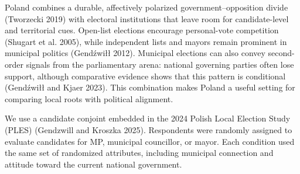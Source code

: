 \documentclass[
  letterpaper,
  DIV=11,
  numbers=noendperiod]{scrartcl}
\newcommand{\criticmarkupadd}[1]{#1}
\newcommand{\criticmarkuprm}[1]{}
\begin{document}
\criticmarkuprm{Candidate conjoint experiments}\criticmarkupadd{Poland
combines a durable, affectively polarized government--opposition divide
(Tworzecki 2019) with electoral institutions that leave room for
candidate-level and territorial cues. Open-list elections encourage
personal-vote competition (Shugart et al. 2005), while independent lists
and mayors remain prominent in municipal politics (Gendźwiłł 2012).
Municipal elections} can \criticmarkuprm{compare several
candidate}\criticmarkupadd{also convey second-order} signals
\criticmarkuprm{within}\criticmarkupadd{from the parliamentary arena:
national governing parties often lose support, although comparative
evidence shows that this pattern is conditional (Gendźwiłł and Kjaer
2023). This combination makes Poland} a \criticmarkuprm{common choice
environment (Hainmueller et al. 2014; Schwarz and Coppock 2022).
Existing applications show that}\criticmarkupadd{useful setting for
comparing} local \criticmarkuprm{ties matter in candidate selection
among party elites (Berz and Jankowski 2022) and alongside party labels
among voters in a polarized US setting (Munis 2021). Our design connects
three comparisons in one argument. The graded treatment establishes
whether stronger municipal embeddedness increases support. The alignment
comparison tests whether national congruence can outweigh those local
roots. The split-ballot office comparison tests whether the local
advantage is confined to specifically local
offices.}\criticmarkupadd{roots with political alignment.}

We use a candidate conjoint embedded in the 2024 Polish Local Election
Study (PLES) (Gendzwill and Kroszka 2025). \criticmarkuprm{Poland
provides a demanding comparison because party competition is organized
around a durable, affectively polarized government--opposition divide
(Tworzecki 2019). }Respondents were randomly assigned to evaluate
candidates for MP, municipal councillor, or mayor.
\criticmarkuprm{Every}\criticmarkupadd{Each} condition used the same
\criticmarkupadd{set of }randomized attributes, including municipal
connection and attitude toward the current national
\criticmarkuprm{government. This national cue is not a party label, but
it locates profiles relative to the principal partisan divide and tests
whether that divide structures subnational candidate
evaluation.}\criticmarkupadd{government.}
\end{document}

